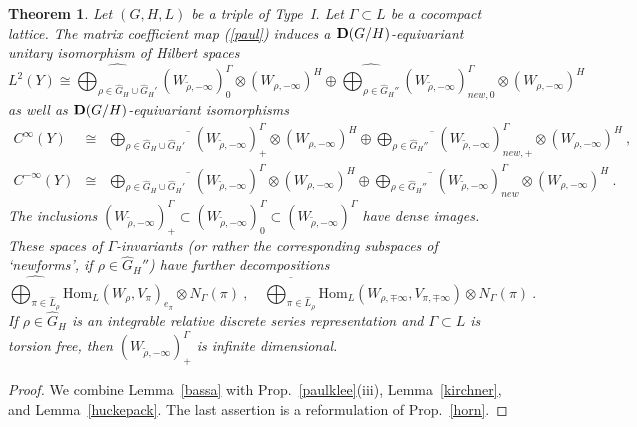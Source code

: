 \documentclass[10]{amsart}
\newtheorem{thm}{Theorem}[section]
\theoremstyle{remark}
\theoremstyle{definition}
\numberwithin{equation}{section}
\newcommand{\Hom}{\mathrm{Hom}}
\begin{document}
{\begin{thm}\label{gogo}
Let $(G,H,L)$ be a triple of Type~I. Let $\Gamma\subset L$ be a cocompact lattice.
The matrix coefficient map (\ref{paul}) induces a ${\bf D}(G/H)$-equivariant unitary isomorphism of Hilbert spaces
$$ L^2(Y)\cong \widehat{\bigoplus_{\rho\in\widehat G_H\cup \widehat G_H'}} (W_{\tilde \rho,-\infty})_0^\Gamma\otimes  (W_{\rho,-\infty})^H
\oplus \widehat{\bigoplus_{\rho\in\widehat G_H''}} (W_{\tilde \rho,-\infty})_{new,0}^\Gamma\otimes  (W_{\rho,-\infty})^H$$
as well as ${\bf D}(G/H)$-equivariant isomorphisms
\begin{eqnarray*}
C^\infty(Y)&\cong& \overline{\bigoplus_{\rho\in\widehat G_H\cup \widehat G_H'}} (W_{\tilde \rho,-\infty})_+^\Gamma\otimes  (W_{\rho,-\infty})^H
\oplus \overline{\bigoplus_{\rho\in\widehat G_H''}} (W_{\tilde \rho,-\infty})_{new,+}^\Gamma\otimes  (W_{\rho,-\infty})^H\ ,\\
C^{-\infty}(Y)&\cong& \overline{\bigoplus_{\rho\in\widehat G_H\cup \widehat G_H'}} (W_{\tilde \rho,-\infty})^\Gamma\otimes  (W_{\rho,-\infty})^H
\oplus \overline{\bigoplus_{\rho\in\widehat G_H''}} (W_{\tilde \rho,-\infty})_{new}^\Gamma\otimes  (W_{\rho,-\infty})^H\ .
\end{eqnarray*}
The inclusions $(W_{\tilde \rho,-\infty})_+^\Gamma\subset (W_{\tilde \rho,-\infty})_0^\Gamma\subset (W_{\tilde \rho,-\infty})^\Gamma$ have dense images.
These spaces of $\Gamma$-invariants (or rather the corresponding subspaces of `newforms', if $\rho\in\widehat G_H''$) have further decompositions
$$
 \widehat{\bigoplus_{\pi\in\widehat L_\rho}} \Hom_L(W_\rho,V_\pi)_{e_\pi}\otimes N_\Gamma(\pi)\ ,\quad
 \overline{\bigoplus_{\pi\in\widehat L_\rho}} \Hom_L(W_{\rho,\mp\infty},V_{\pi,\mp\infty})\otimes N_\Gamma(\pi)\ .
$$
If $\rho\in\widehat G_H$ is an integrable relative discrete series representation and $\Gamma\subset L$ is torsion free, then $(W_{\tilde \rho,-\infty})_+^\Gamma$ is infinite dimensional.
\end{thm}

\begin{proof} We combine  Lemma~\ref{bassa} with Prop.~\ref{paulklee}(iii), Lemma~\ref{kirchner}, and Lemma~\ref{huckepack}. The last assertion is a reformulation of Prop.~\ref{horn}.
\end{proof}

}
\end{document}
